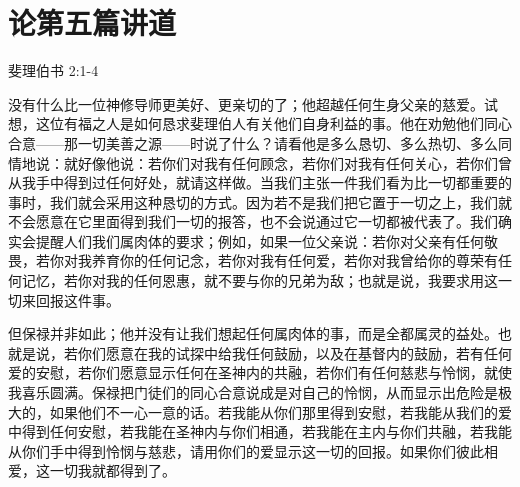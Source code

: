 

\section{论第五篇讲道}

斐理伯书 2:1-4 \par

\par

没有什么比一位神修导师更美好、更亲切的了；他超越任何生身父亲的慈爱。试想，这位有福之人是如何恳求斐理伯人有关他们自身利益的事。他在劝勉他们同心合意——那一切美善之源——时说了什么？请看他是多么恳切、多么热切、多么同情地说：就好像他说：若你们对我有任何顾念，若你们对我有任何关心，若你们曾从我手中得到过任何好处，就请这样做。当我们主张一件我们看为比一切都重要的事时，我们就会采用这种恳切的方式。因为若不是我们把它置于一切之上，我们就不会愿意在它里面得到我们一切的报答，也不会说通过它一切都被代表了。我们确实会提醒人们我们属肉体的要求；例如，如果一位父亲说：若你对父亲有任何敬畏，若你对我养育你的任何记念，若你对我有任何爱，若你对我曾给你的尊荣有任何记忆，若你对我的任何恩惠，就不要与你的兄弟为敌；也就是说，我要求用这一切来回报这件事。\par

但保禄并非如此；他并没有让我们想起任何属肉体的事，而是全都属灵的益处。也就是说，若你们愿意在我的试探中给我任何鼓励，以及在基督内的鼓励，若有任何爱的安慰，若你们愿意显示任何在圣神内的共融，若你们有任何慈悲与怜悯，就使我喜乐圆满。保禄把门徒们的同心合意说成是对自己的怜悯，从而显示出危险是极大的，如果他们不一心一意的话。若我能从你们那里得到安慰，若我能从我们的爱中得到任何安慰，若我能在圣神内与你们相通，若我能在主内与你们共融，若我能从你们手中得到怜悯与慈悲，请用你们的爱显示这一切的回报。如果你们彼此相爱，这一切我就都得到了。\par

 \par


